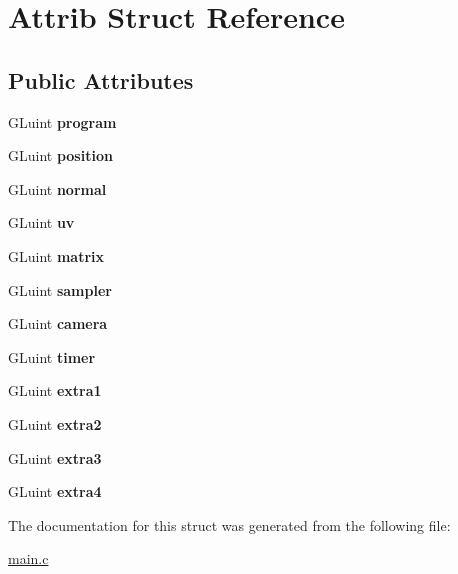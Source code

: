 \hypertarget{structAttrib}{}\section{Attrib Struct Reference}
\label{structAttrib}
\subsection*{Public Attributes}
\begin{DoxyCompactItemize}
\item 
\mbox{\label{structAttrib_accbe71d8cd2e04669694902abddf88fd}} 
G\+Luint {\bfseries program}
\item 
\mbox{\label{structAttrib_a2e8900e46275e6dba5de47a6cb3fb014}} 
G\+Luint {\bfseries position}
\item 
\mbox{\label{structAttrib_a1747ed761cce42decf0b1f48e2d424aa}} 
G\+Luint {\bfseries normal}
\item 
\mbox{\label{structAttrib_a91a6c5203f836990dfd2529a4dd128ce}} 
G\+Luint {\bfseries uv}
\item 
\mbox{\label{structAttrib_abf01f51d610dd0ddf14ef44565505dd0}} 
G\+Luint {\bfseries matrix}
\item 
\mbox{\label{structAttrib_ab176427e061e47c040d0a8d25488fd6d}} 
G\+Luint {\bfseries sampler}
\item 
\mbox{\label{structAttrib_a8f4457820b9ba58eeb332bac333c5e55}} 
G\+Luint {\bfseries camera}
\item 
\mbox{\label{structAttrib_aa27da229009adea9e3729e80f7b200b5}} 
G\+Luint {\bfseries timer}
\item 
\mbox{\label{structAttrib_a128a2b0c82df58158709832564ad5ec2}} 
G\+Luint {\bfseries extra1}
\item 
\mbox{\label{structAttrib_a3aeae3bea2c6eda1a2fd8e2387f46dc5}} 
G\+Luint {\bfseries extra2}
\item 
\mbox{\label{structAttrib_a8695ec97ee35d7edda5578eb356ea89c}} 
G\+Luint {\bfseries extra3}
\item 
\mbox{\label{structAttrib_a3cfb70967ab07898959cb0dce7a72ce4}} 
G\+Luint {\bfseries extra4}
\end{DoxyCompactItemize}


The documentation for this struct was generated from the following file\+:\begin{DoxyCompactItemize}
\item 
\hyperlink{main_8c}{main.\+c}\end{DoxyCompactItemize}
